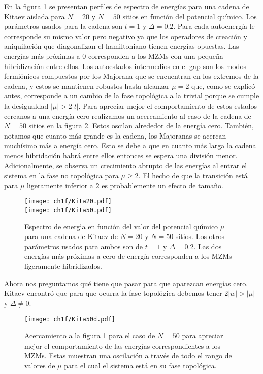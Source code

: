 En la figura \ref{fig:kitaev} se presentan perfiles de espectro de energ\'{i}as para una cadena de Kitaev aislada para $N=20$ y $N=50$ sitios en funci\'{o}n del potencial qu\'{i}mico. Los par\'{a}metros usados para la cadena son $t=1$ y $\Delta=0.2$. Para cada autoenerg\'{i}a le corresponde su mismo valor pero negativo ya que los operadores de creaci\'{o}n y aniquilaci\'{o}n que diagonalizan el hamiltoniano tienen energ\'{i}as opuestas. Las energ\'{i}as m\'{a}s pr\'{o}ximas a $0$ corresponden a los MZMs con una peque\~{n}a hibridizaci\'{o}n entre ellos. Los autoestados intermedios en el gap son los modos fermi\'{o}nicos compuestos por los Majorana que se encuentran en los extremos de la cadena, y estos se mantienen robustos hasta alcanzar $\mu=2$ que, como se explic\'{o} antes, corresponde a un cambio de la fase topol\'{o}gica a la trivial porque se cumple la desigualdad $|\mu|>2|t|$. 
Para apreciar mejor el comportamiento de estos estados cercanos a una energ\'{i}a cero realizamos un acercamiento al caso de la cadena de $N=50$ sitios en la figura \ref{fig:kita50d}. Estos oscilan alrededor de la energ\'{i}a cero. Tambi\'{e}n, notamos que cuanto m\'{a}s grande es la cadena, los Majoranas se acercan much\'{i}simo m\'{a}s a energ\'{i}a cero. Esto se debe a que en cuanto m\'{a}s larga la cadena menos hibridaci\'{o}n habr\'{a} entre ellos entonces se espera una divisi\'{o}n menor. Adicionalmente, se observa un crecimiento abrupto de las energ\'{i}as al entrar el sistema en la fase no topol\'{o}gica para $\mu\geq 2$. El hecho de que la transici\'{o}n est\'{a} para $\mu$ ligeramente inferior a $2$ es probablemente un efecto de tama\~{n}o. 
%
\begin{figure}[th]
\begin{center}
\texttt{[image: ch1f/Kita20.pdf]}\\
\vspace{-0.3cm}
\texttt{[image: ch1f/Kita50.pdf]}
\end{center}
\caption{Espectro de energı́a en función del valor del potencial quı́mico $\mu$ para una cadena de Kitaev de $N=20$ y $N=50$ sitios. Los otros par\'{a}metros usados para ambos son de $t=1$ y $\Delta=0.2$. Las dos energías más próximas a cero de energ\'{i}a corresponden a los MZMs ligeramente hibridizados.}
\label{fig:kitaev}
\end{figure}%
Ahora nos preguntamos qu\'{e} tiene que pasar para que aparezcan energ\'{i}as cero. Kitaev encontr\'{o} que para que ocurra la fase topol\'{o}gica debemos tener $2|w|>|\mu|$ y $\Delta \neq 0$. 
%
%
\begin{figure}[th]
    \centering
    \texttt{[image: ch1f/Kita50d.pdf]}
    \caption{Acercamiento a la figura \ref{fig:kitaev} para el caso de $N=50$ para apreciar mejor el comportamiento de las energ\'{i}as correspondientes a los MZMs. Estas muestran una oscilaci\'{o}n a trav\'{e}s de todo el rango de valores de $\mu$ para el cual el sistema est\'{a} en su fase topol\'{o}gica.}
    \label{fig:kita50d}
\end{figure}
